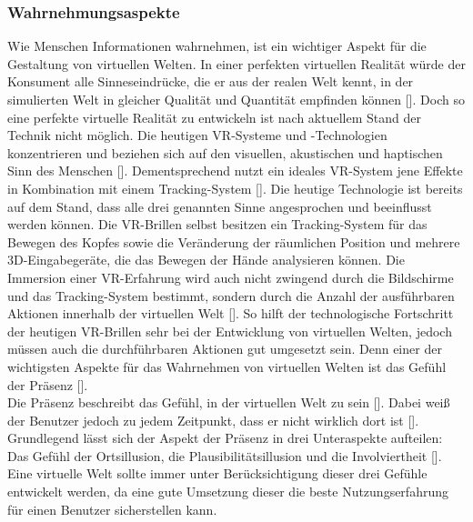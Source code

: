 \documentclass[a4paper,12pt,oneside]{article}
\begin{document}
      \subsubsection{Wahrnehmungsaspekte} \label{Wahrnehmungsaspekte}
        Wie Menschen Informationen wahrnehmen, ist ein wichtiger Aspekt für die Gestaltung
        von virtuellen Welten. In einer perfekten virtuellen Realität würde der Konsument
        alle Sinneseindrücke, die er aus der realen Welt kennt, in der simulierten Welt
        in gleicher Qualität und Quantität empfinden können [\cite[17]{Dorner2013}].
        Doch so eine perfekte virtuelle Realität zu entwickeln ist nach aktuellem Stand
        der Technik nicht möglich. Die heutigen VR-Systeme und -Technologien
        konzentrieren und beziehen sich auf den visuellen, akustischen und haptischen Sinn
        des Menschen [\cite[34]{Dorner2013}]. Dementsprechend nutzt ein ideales
        VR-System jene Effekte in Kombination mit einem
        Tracking-System [\cite{Slater2009}]. Die heutige Technologie ist bereits auf
        dem Stand, dass alle drei genannten Sinne angesprochen und beeinflusst
        werden können. Die VR-Brillen selbst besitzen ein Tracking-System für das
        Bewegen des Kopfes sowie die Veränderung der räumlichen Position und mehrere 
        3D-Eingabegeräte,
        die das Bewegen der Hände analysieren können. Die Immersion einer VR-Erfahrung
        wird auch nicht zwingend durch die Bildschirme und das Tracking-System bestimmt,
        sondern durch die Anzahl der ausführbaren Aktionen innerhalb der virtuellen 
        Welt [\cite{Slater2009}]. So hilft der technologische Fortschritt der 
        heutigen VR-Brillen
        sehr bei der Entwicklung von virtuellen Welten, jedoch müssen auch die
        durchführbaren Aktionen gut umgesetzt sein. Denn einer der wichtigsten Aspekte
        für das Wahrnehmen von virtuellen Welten ist das Gefühl der 
        Präsenz [\cite{Slater2009}]. \\
        Die Präsenz beschreibt das Gefühl, in der 
        virtuellen Welt zu sein [\cite{Slater2009}]. 
        Dabei weiß der Benutzer jedoch zu jedem Zeitpunkt, dass er
        nicht wirklich dort ist [\cite{Slater2009}]. Grundlegend lässt sich der 
        Aspekt der Präsenz in
        drei Unteraspekte aufteilen: Das Gefühl der Ortsillusion, die Plausibilitätsillusion
        und die Involviertheit [\cite[18-19]{Dorner2013}]. Eine virtuelle Welt sollte immer unter
        Berücksichtigung dieser drei Gefühle entwickelt werden, da eine gute Umsetzung
        dieser die beste Nutzungserfahrung für einen Benutzer sicherstellen kann. \\
\end{document}
